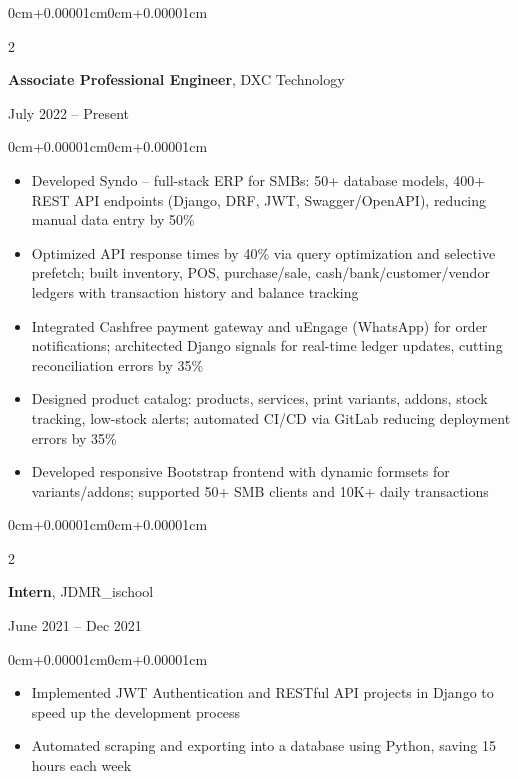\documentclass[10pt, letterpaper]{article}
\newenvironment{highlightscompact}{
    \begin{itemize}[topsep=0.04cm, parsep=0.04cm, partopsep=0pt, itemsep=0pt, leftmargin=10pt]
}{
    \end{itemize}
}
\newenvironment{onecolentry}{
    \begin{adjustwidth}{0cm+0.00001cm}{0cm+0.00001cm}
}{
    \end{adjustwidth}
}
\newenvironment{twocolentry}[2][]{
    \onecolentry
    \def\secondColumn{#2}
    \setcolumnwidth{\fill, 4.2cm}
    \begin{paracol}{2}
}{
    \switchcolumn \raggedleft \secondColumn
    \end{paracol}
    \end{adjustwidth}
}
\begin{document}
    \begin{twocolentry}{July 2022 -- Present}
        \textbf{Associate Professional Engineer}, DXC Technology
    \end{twocolentry}
    \vspace{0.1cm}
    \begin{onecolentry}
        \begin{highlightscompact}
            \item Developed Syndo -- full-stack ERP for SMBs: 50+ database models, 400+ REST API endpoints (Django, DRF, JWT, Swagger/OpenAPI), reducing manual data entry by 50\%
            \item Optimized API response times by 40\% via query optimization and selective prefetch; built inventory, POS, purchase/sale, cash/bank/customer/vendor ledgers with transaction history and balance tracking
            \item Integrated Cashfree payment gateway and uEngage (WhatsApp) for order notifications; architected Django signals for real-time ledger updates, cutting reconciliation errors by 35\%
            \item Designed product catalog: products, services, print variants, addons, stock tracking, low-stock alerts; automated CI/CD via GitLab reducing deployment errors by 35\%
            \item Developed responsive Bootstrap frontend with dynamic formsets for variants/addons; supported 50+ SMB clients and 10K+ daily transactions
        \end{highlightscompact}
    \end{onecolentry}

    \begin{twocolentry}{June 2021 -- Dec 2021}
        \textbf{Intern}, JDMR\_ischool
    \end{twocolentry}
    \vspace{0.1cm}
    \begin{onecolentry}
        \begin{highlightscompact}
            \item Implemented JWT Authentication and RESTful API projects in Django to speed up the development process
            \item Automated scraping and exporting into a database using Python, saving 15 hours each week
        \end{highlightscompact}
    \end{onecolentry}
\end{document}

